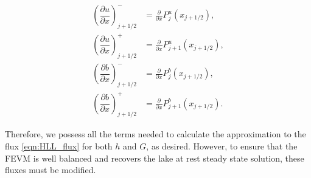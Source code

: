 \begin{subequations}
	\begin{align}
	\left(\dfrac{\partial {u}}{\partial x} \right)^-_{j + 1/2} &= \frac{\partial }{\partial x}P^u_j(x_{j+1/2}),  \\
	\left(\dfrac{\partial {u}}{\partial x} \right)^+_{j + 1/2} &= \frac{\partial }{\partial x}P^u_{j+1}(x_{j+1/2}),  \\
	\left(\dfrac{\partial {b}}{\partial x} \right)^-_{j + 1/2} &= \frac{\partial }{\partial x}P^b_j(x_{j+1/2}), \\
	\left(\dfrac{\partial {b}}{\partial x} \right)^+_{j + 1/2} &= \frac{\partial }{\partial x}P^b_{j+1}(x_{j+1/2}). 	\end{align}
	\label{eqn:dbduRecon}
\end{subequations}

Therefore, we possess all the terms needed to calculate the approximation to the flux \eqref{eqn:HLL_flux} for both $h$ and $G$, as desired. However, to ensure that the FEVM is well balanced and recovers the lake at rest steady state solution, these fluxes must be modified.

